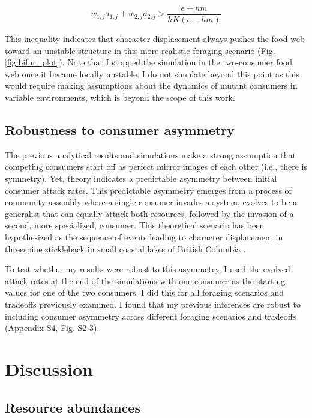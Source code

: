 \documentclass[11pt,]{article}
\begin{document}
\begin{equation} \label{eq:8}
  w_{1,j}a_{1,j}+w_{2,j}a_{2,j} > \frac{e+hm}{hK(e-hm)}
\end{equation}

This inequality indicates that character displacement always pushes the
food web toward an unstable structure in this more realistic foraging
scenario (Fig. \ref{fig:bifur_plot}). Note that I stopped the simulation
in the two-consumer food web once it became locally unstable. I do not
simulate beyond this point as this would require making assumptions
about the dynamics of mutant consumers in variable environments, which
is beyond the scope of this work.

\subsection{Robustness to consumer
asymmetry}\label{robustness-to-consumer-asymmetry}

The previous analytical results and simulations make a strong assumption
that competing consumers start off as perfect mirror images of each
other (i.e., there is symmetry). Yet, theory indicates a predictable
asymmetry between initial consumer attack rates. This predictable
asymmetry emerges from a process of community assembly where a single
consumer invades a system, evolves to be a generalist that can equally
attack both resources, followed by the invasion of a second, more
specialized, consumer. This theoretical scenario has been hypothesized
as the sequence of events leading to character displacement in
threespine stickleback in small coastal lakes of British Columbia
\citep{Schluter1992, Schluter2000}.

To test whether my results were robust to this asymmetry, I used the
evolved attack rates at the end of the simulations with one consumer as
the starting values for one of the two consumers. I did this for all
foraging scenarios and tradeoffs previously examined. I found that my
previous inferences are robust to including consumer asymmetry across
different foraging scenarios and tradeoffs (Appendix S4, Fig. S2-3).

\section{Discussion}\label{discussion}

\subsection{Resource abundances}\label{resource-abundances}
\end{document}
